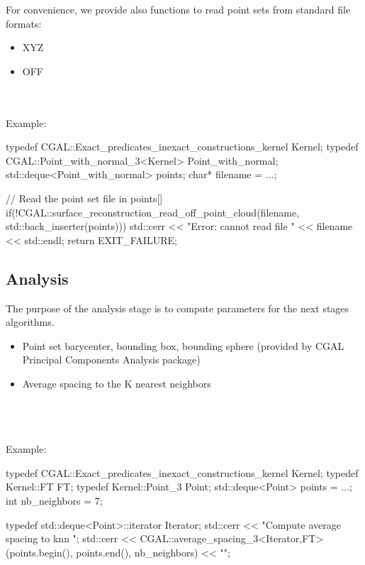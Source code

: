 For convenience, we provide also functions to read point sets from standard file formats:

\begin{itemize}
\item XYZ
\item OFF
\end{itemize}

  \\
  \\

Example:

\begin{ccExampleCode}
typedef CGAL::Exact_predicates_inexact_constructions_kernel Kernel;
typedef CGAL::Point_with_normal_3<Kernel> Point_with_normal;
std::deque<Point_with_normal> points;
char* filename = ...;

// Read the point set file in points[]
if(!CGAL::surface_reconstruction_read_off_point_cloud(filename,
                                                      std::back_inserter(points)))
{
  std::cerr << "Error: cannot read file " << filename << std::endl;
  return EXIT_FAILURE;
}
\end{ccExampleCode}


\subsection{Analysis}

The purpose of the analysis stage is to compute parameters for the next stages algorithms.

\begin{itemize}
\item Point set barycenter, bounding box, bounding sphere (provided by CGAL Principal Components Analysis package)
\item Average spacing to the K nearest neighbors
\end{itemize}

  \\
  \\
  \\

Example:

\begin{ccExampleCode}
typedef CGAL::Exact_predicates_inexact_constructions_kernel Kernel;
typedef Kernel::FT FT;
typedef Kernel::Point_3 Point;
std::deque<Point> points = ...;
int nb_neighbors = 7;

typedef std::deque<Point>::iterator Iterator;
std::cerr << "Compute average spacing to knn ";
std::cerr << CGAL::average_spacing_3<Iterator,FT>(points.begin(), points.end(),
                                                  nb_neighbors) << "\n";
\end{ccExampleCode}


